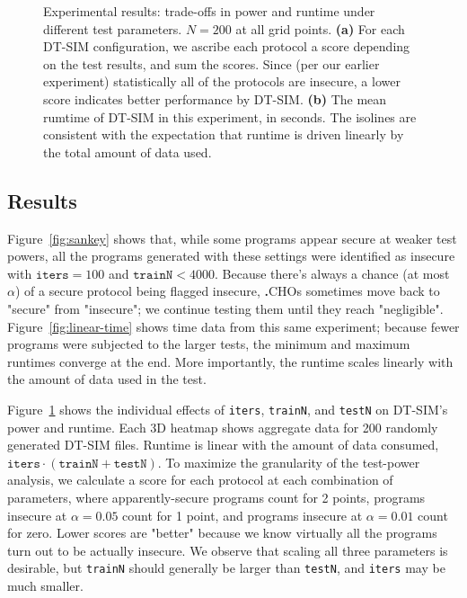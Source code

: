 \documentclass[acmlarge, manuscript, screen, review, anonymous, table]{acmart}
\newcommand{\langname}{\textsc{\textbf{.}CHO}\xspace}
\newcommand{\toolname}{\textsc{DT-SIM}\xspace}
\begin{document}
\begin{figure}[tbhp]
\begin{tabular}{c  c c}
\end{tabular}
\caption{Experimental results: trade-offs in power and runtime under different test parameters.
    $N=200$ at all grid points.
    \textbf{(a)} For each \toolname configuration, we ascribe each protocol a score depending on the test results, and sum the scores.
    Since (per our earlier experiment) statistically all of the protocols are insecure, a lower score indicates better performance by \toolname.
    \textbf{(b)} The mean rumtime of \toolname in this experiment, in seconds.
    The isolines are consistent with the expectation that runtime is driven linearly by the total amount of data used.}
\label{fig:cube-search}
\end{figure}

\subsection{Results}
Figure~\ref{fig:sankey} shows that, while some programs appear secure at weaker test powers,
all the programs generated with these settings were identified as insecure with $\texttt{iters}=100$ and $\texttt{trainN}<4000$.
Because there's always a chance (at most $\alpha$) of a secure protocol being flagged insecure,
\langname{}s sometimes move back to "secure" from "insecure"; we continue testing them until they reach "negligible".
Figure~\ref{fig:linear-time} shows time data from this same experiment;
because fewer programs were subjected to the larger tests, the minimum and maximum runtimes converge at the end.
More importantly, the runtime scales linearly with the amount of data used in the test.

Figure~\ref{fig:cube-search} shows the individual effects of \texttt{iters}, \texttt{trainN}, and \texttt{testN} on \toolname's power and runtime.
Each 3D heatmap shows aggregate data for 200 randomly generated \toolname files.
Runtime is linear with the amount of data consumed, $\texttt{iters} \cdot (\texttt{trainN} + \texttt{testN})$.
To maximize the granularity of the test-power analysis, we calculate a score for each protocol at each combination of parameters,
where apparently-secure programs count for 2 points,
programs insecure at $\alpha=0.05$ count for 1 point,
and programs insecure at $\alpha=0.01$ count for zero.
Lower scores are "better" because we know virtually all the programs turn out to be actually insecure.
We observe that scaling all three parameters is desirable,
but \texttt{trainN} should generally be larger than \texttt{testN},
and \texttt{iters} may be much smaller.
\end{document}
